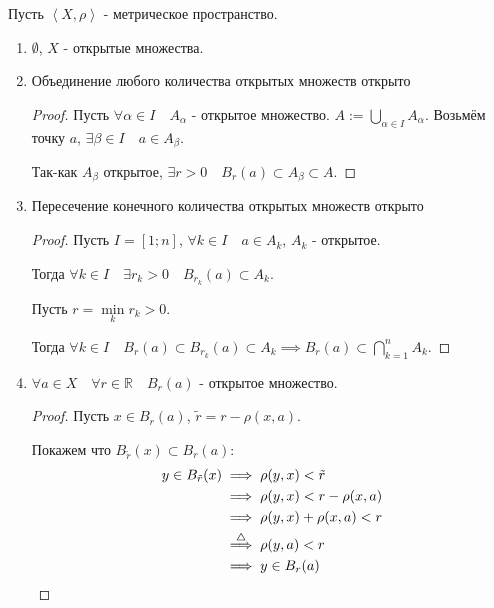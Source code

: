\begin{properties} \thmslashn

    Пусть $\left<X, \rho\right>$ - метрическое пространство.
    \begin{enumerate}
        \item $ \emptyset$, $X$ - открытые множества.
        \item Объединение любого количества открытых множеств открыто
            \begin{proof} \thmslashn
            
                Пусть $\forall{\alpha\in I}\quad A_{\alpha}$ - открытое множество. $A := \bigcup\limits_{\alpha\in I} A_{\alpha}$.
               Возьмём точку $a$,  $\exists{\beta\in I}\quad a\in A_{\beta}$.

               Так-как $A_{\beta}$ открытое, $\exists{r > 0}\quad B_{r}(a) \subset A_{\beta} \subset A$. 
            \end{proof}
        \item Пересечение конечного количества открытых множеств открыто
            \begin{proof} \thmslashn
            
                Пусть $I = [1; n]$, $\forall{k\in I}\quad a\in A_{k}$, $A_{k}$ - открытое.

                Тогда $\forall{k\in I}\quad \exists{r_{k} > 0}\quad B_{r_{k}}(a) \subset A_{k}$.

                Пусть $r = \min\limits_{k} r_{k} > 0$.

                Тогда $\forall{k\in I}\quad B_{r}(a) \subset B_{r_{k}}(a) \subset A_{k} \implies B_{r}(a) \subset \bigcap\limits_{k=1}^{n} A_{k}$.
            \end{proof}
        \item $\forall{a\in X}\quad \forall{r\in \mathbb{R}}\quad B_{r}(a)$ - открытое множество.
            \begin{proof} \thmslashn
                

                Пусть $x\in B_{r}(a)$, $\tilde{r} = r - \rho(x, a)$.

                Покажем что $B_{\tilde{r}}(x) \subset B_{r}(a)$:
                \begin{equation*}
                    \begin{split}
                        y\in B_{\tilde{r}}(x) 
                        &\implies \rho(y, x) < \tilde{r}\\
                        &\implies \rho(y, x) < r - \rho(x, a)\\
                        &\implies \rho(y, x) + \rho(x, a) < r\\
                        & \overset{\triangle}{\implies} \rho(y, a) < r\\
                        &\implies y\in B_{r}(a) \qedhere
                    \end{split}
                \end{equation*}
            \end{proof}
    \end{enumerate}
\end{properties}

